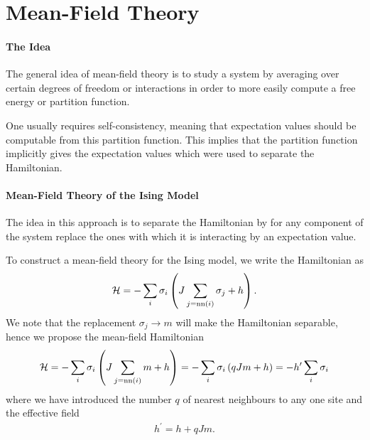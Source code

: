\section{Mean-Field Theory}

\paragraph{The Idea}
The general idea of mean-field theory is to study a system by averaging over certain degrees of freedom or interactions in order to more easily compute a free energy or partition function.

One usually requires self-consistency, meaning that expectation values should be computable from this partition function. This implies that the partition function implicitly gives the expectation values which were used to separate the Hamiltonian.

\paragraph{Mean-Field Theory of the Ising Model}
The idea in this approach is to separate the Hamiltonian by for any component of the system replace the ones with which it is interacting by an expectation value.

To construct a mean-field theory for the Ising model, we write the Hamiltonian as
\begin{align*}
	\mathcal{H} = -\sum\limits_{i}\sigma_{i}\left(J\sum\limits_{j = \text{nn}(i)}\sigma_{j} + h\right).
\end{align*}
We note that the replacement $\sigma_{j}\to m$ will make the Hamiltonian separable, hence we propose the mean-field Hamiltonian
\begin{align*}
	\mathcal{H} = -\sum\limits_{i}\sigma_{i}\left(J\sum\limits_{j = \text{nn}(i)}m + h\right) = -\sum\limits_{i}\sigma_{i}\left(qJm + h\right) = -h^{\prime}\sum\limits_{i}\sigma_{i}
\end{align*}
where we have introduced the number $q$ of nearest neighbours to any one site and the effective field
\begin{align*}
	h^{\prime} = h + qJm.
\end{align*}

